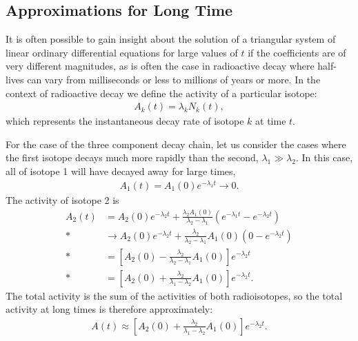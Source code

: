 \subsection{Approximations for Long Time}

It is often possible to gain insight about the solution of a triangular system of linear ordinary differential equations for large values of $t$ if the coefficients are of very different magnitudes, as is often the case in radioactive decay where half-lives can vary from milliseconds or less to millions of years or more. In the context of radioactive decay we define the activity of a particular isotope:
\begin{align}
  A_k(t) = \lambda_k N_k(t),
\end{align}
which represents the instantaneous decay rate of isotope $k$ at time $t$.

For the case of the three component decay chain, let us consider the cases where the first isotope decays much more rapidly than the second, $\lambda_1 \gg \lambda_2$. In this case, all of isotope 1 will have decayed away for large times,
\begin{align}
  A_1(t) = A_1(0) e^{-\lambda_1 t} \rightarrow 0.
\end{align}
The activity of isotope 2 is
\begin{align}
  A_2(t) &= A_2(0) e^{-\lambda_2 t} + \frac{\lambda_2 A_1(0)}{\lambda_2 - \lambda_1} \left( e^{- \lambda_1 t} -  e^{-\lambda_2 t} \right) \nonumber \\*
         &\rightarrow A_2(0) e^{-\lambda_2 t} + \frac{\lambda_2}{\lambda_2 - \lambda_1} A_1(0) \left( 0 -  e^{-\lambda_2 t} \right) \nonumber \\*
         &= \left[ A_2(0) - \frac{\lambda_2}{\lambda_2 - \lambda_1} A_1(0) \right] e^{-\lambda_2 t} \nonumber \\*
         &= \left[ A_2(0) + \frac{\lambda_2}{\lambda_1 - \lambda_2} A_1(0) \right] e^{-\lambda_2 t} .
\end{align}
The total activity is the sum of the activities of both radioisotopes, so the total activity at long times is therefore approximately:
\begin{align}
  A(t) \approx \left[ A_2(0) + \frac{\lambda_2}{\lambda_1 - \lambda_2} A_1(0) \right] e^{-\lambda_2 t} .
\end{align}

